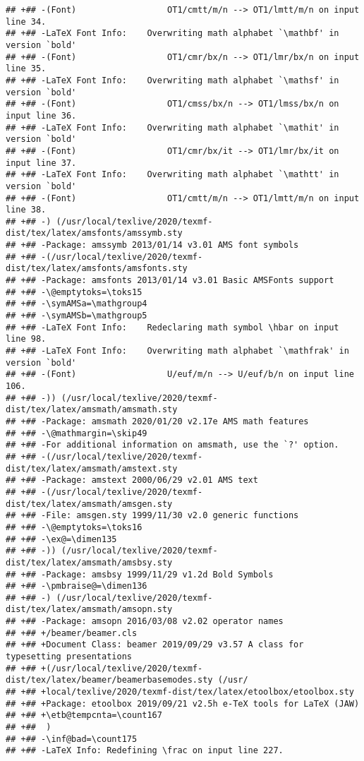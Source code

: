 \documentclass[ignorenonframetext,]{beamer}
\begin{document}
\begin{verbatim}
## +## -(Font)                  OT1/cmtt/m/n --> OT1/lmtt/m/n on input line 34.
## +## -LaTeX Font Info:    Overwriting math alphabet `\mathbf' in version `bold'
## +## -(Font)                  OT1/cmr/bx/n --> OT1/lmr/bx/n on input line 35.
## +## -LaTeX Font Info:    Overwriting math alphabet `\mathsf' in version `bold'
## +## -(Font)                  OT1/cmss/bx/n --> OT1/lmss/bx/n on input line 36.
## +## -LaTeX Font Info:    Overwriting math alphabet `\mathit' in version `bold'
## +## -(Font)                  OT1/cmr/bx/it --> OT1/lmr/bx/it on input line 37.
## +## -LaTeX Font Info:    Overwriting math alphabet `\mathtt' in version `bold'
## +## -(Font)                  OT1/cmtt/m/n --> OT1/lmtt/m/n on input line 38.
## +## -) (/usr/local/texlive/2020/texmf-dist/tex/latex/amsfonts/amssymb.sty
## +## -Package: amssymb 2013/01/14 v3.01 AMS font symbols
## +## -(/usr/local/texlive/2020/texmf-dist/tex/latex/amsfonts/amsfonts.sty
## +## -Package: amsfonts 2013/01/14 v3.01 Basic AMSFonts support
## +## -\@emptytoks=\toks15
## +## -\symAMSa=\mathgroup4
## +## -\symAMSb=\mathgroup5
## +## -LaTeX Font Info:    Redeclaring math symbol \hbar on input line 98.
## +## -LaTeX Font Info:    Overwriting math alphabet `\mathfrak' in version `bold'
## +## -(Font)                  U/euf/m/n --> U/euf/b/n on input line 106.
## +## -)) (/usr/local/texlive/2020/texmf-dist/tex/latex/amsmath/amsmath.sty
## +## -Package: amsmath 2020/01/20 v2.17e AMS math features
## +## -\@mathmargin=\skip49
## +## -For additional information on amsmath, use the `?' option.
## +## -(/usr/local/texlive/2020/texmf-dist/tex/latex/amsmath/amstext.sty
## +## -Package: amstext 2000/06/29 v2.01 AMS text
## +## -(/usr/local/texlive/2020/texmf-dist/tex/latex/amsmath/amsgen.sty
## +## -File: amsgen.sty 1999/11/30 v2.0 generic functions
## +## -\@emptytoks=\toks16
## +## -\ex@=\dimen135
## +## -)) (/usr/local/texlive/2020/texmf-dist/tex/latex/amsmath/amsbsy.sty
## +## -Package: amsbsy 1999/11/29 v1.2d Bold Symbols
## +## -\pmbraise@=\dimen136
## +## -) (/usr/local/texlive/2020/texmf-dist/tex/latex/amsmath/amsopn.sty
## +## -Package: amsopn 2016/03/08 v2.02 operator names
## +## +/beamer/beamer.cls
## +## +Document Class: beamer 2019/09/29 v3.57 A class for typesetting presentations
## +## +(/usr/local/texlive/2020/texmf-dist/tex/latex/beamer/beamerbasemodes.sty (/usr/
## +## +local/texlive/2020/texmf-dist/tex/latex/etoolbox/etoolbox.sty
## +## +Package: etoolbox 2019/09/21 v2.5h e-TeX tools for LaTeX (JAW)
## +## +\etb@tempcnta=\count167
## +##  )
## +## -\inf@bad=\count175
## +## -LaTeX Info: Redefining \frac on input line 227.

\end{verbatim}
\end{document}
